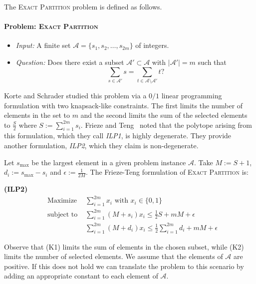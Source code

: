 \documentclass[3p, twocolumn]{elsarticle}
\begin{document}
The \textsc{Exact Partition} problem is defined as follows.

\paragraph{Problem: \textsc{Exact Partition}}
\begin{itemize}
\item[] \textit{Input:} A finite set \( \mathcal{A} = \{s_1, s_2, \ldots, s_{2m}\} \) of integers.
\item[] \textit{Question:} Does there exist a subset \( \mathcal{A'} \subset \mathcal{A} \) with \( |\mathcal{A'}| = m \) such that
\[\sum_{s \in \mathcal{A'}} s = \sum_{t \in \mathcal{A} \setminus \mathcal{A'}} t ?\]
\end{itemize}

Korte and Schrader \cite{KorteSchrader} studied this problem via a $0/1$ linear programming formulation with two knapsack-like constraints.  The first limits the number of elements in the set to $m$ and the second limits the sum of the selected elements to $\displaystyle \frac{S}{2}$ where $S := \displaystyle \sum_{i=1}^{2m} s_i$.
Frieze and Teng~\cite{FT94} noted that the polytope arising from this formulation, which they call \textit{ILP1}, is highly degenerate. They provide another formulation, \textit{ILP2}, which they claim is non-degenerate. 


Let $s_{\max}$ be the largest element in a given problem instance $\mathcal{A}$. Take $M := S + 1$, $d_i := s_{\max}-s_i$ and $\epsilon := \frac{1}{2M}$.  The Frieze-Teng formulation of \textsc{Exact Partition} is:
\vspace{1em}

\textbf{(ILP2) }
\begin{align*}
& \text{Maximize } & \sum_{i=1}^{2m} x_i \text{ with } x_i \in \{0, 1\} \qquad \qquad \qquad \\
& \text{subject to } & \sum_{i=1}^{2m} (M + s_i)x_i \leq \tfrac{1}{2} S + mM + \epsilon \qquad \tag{K1} \\
& & \sum_{i=1}^{2m} (M + d_i)x_i \leq \tfrac{1}{2} \sum_{i=1}^{2m} d_i + mM + \epsilon \tag{K2}
\end{align*}

Observe that (K1) limits the sum of elements in the chosen subset, while (K2) limits the number of selected elements. We assume that the elements of $\mathcal{A}$ are positive.
If this does not hold we can translate the problem to this scenario by adding an appropriate constant to each element of $\mathcal{A}$.
\end{document}
